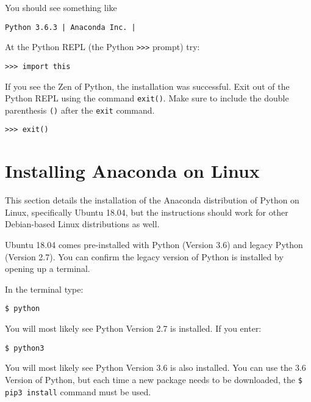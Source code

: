 \documentclass{book}
\newcommand{\passthrough}[1]{#1}
\begin{document}
You should see something like

\begin{lstlisting}
Python 3.6.3 | Anaconda Inc. |
\end{lstlisting}

At the Python REPL (the Python \passthrough{\lstinline!>>>!} prompt)
try:

\begin{lstlisting}
>>> import this
\end{lstlisting}

If you see the Zen of Python, the installation was successful. Exit out
of the Python REPL using the command \passthrough{\lstinline!exit()!}.
Make sure to include the double parenthesis \passthrough{\lstinline!()!}
after the \passthrough{\lstinline!exit!} command.

\begin{lstlisting}
>>> exit()
\end{lstlisting}
    




    
        \hypertarget{installing-anaconda-on-linux}{%
\section{Installing Anaconda on
Linux}\label{installing-anaconda-on-linux}}
    




    
        This section details the installation of the Anaconda distribution of
Python on Linux, specifically Ubuntu 18.04, but the instructions should
work for other Debian-based Linux distributions as well.

Ubuntu 18.04 comes pre-installed with Python (Version 3.6) and legacy
Python (Version 2.7). You can confirm the legacy version of Python is
installed by opening up a terminal.

In the terminal type:

\begin{lstlisting}
$ python
\end{lstlisting}

You will most likely see Python Version 2.7 is installed. If you enter:

\begin{lstlisting}
$ python3
\end{lstlisting}

You will most likely see Python Version 3.6 is also installed. You can
use the 3.6 Version of Python, but each time a new package needs to be
downloaded, the \passthrough{\lstinline!$ pip3 install!} command must be
used.
\end{document}
